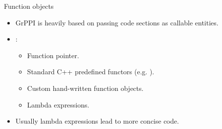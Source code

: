 \begin{frame}[t]{Function objects}
\begin{itemize}
  \item GrPPI is heavily based on passing code sections as callable entities.
  \vfill
  \item {}:
    \pause
    \begin{itemize}[<+->]
      \item Function pointer.
      \item Standard C++ predefined functors (e.g. ).
      \item Custom hand-written function objects.
      \item Lambda expressions.
    \end{itemize}
  \vfill\pause
  \item Usually lambda expressions lead to more concise code.
\end{itemize}
\end{frame}

